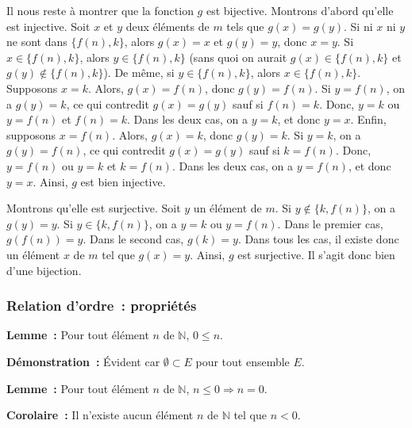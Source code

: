     Il nous reste à montrer que la fonction $g$ est bijective. 
    Montrons d'abord qu'elle est injective. 
    Soit $x$ et $y$ deux éléments de $m$ tels que $g(x) = g(y)$.
    Si ni $x$ ni $y$ ne sont dans $\lbrace f(n), k \rbrace$, alors $g(x) = x$ et $g(y) = y$, donc $x=y$. 
    Si $x \in \lbrace f(n), k \rbrace$, alors $y \in \lbrace f(n), k \rbrace$ (sans quoi on aurait $g(x) \in \lbrace f(n), k \rbrace$ et $g(y) \notin \lbrace f(n), k \rbrace$). 
    De même, si $y \in \lbrace f(n), k \rbrace$, alors $x \in \lbrace f(n), k \rbrace$. 
    Supposons $x = k$. 
    Alors, $g(x) = f(n)$, donc $g(y) = f(n)$. 
    Si $y = f(n)$, on a $g(y) = k$, ce qui contredit $g(x) = g(y)$ sauf si $f(n) = k$. 
    Donc, $y = k$ ou $y = f(n)$ et $f(n) = k$. 
    Dans les deux cas, on a $y = k$, et donc $y = x$. 
    Enfin, supposons $x = f(n)$. 
    Alors, $g(x) = k$, donc $g(y) = k$. 
    Si $y = k$, on a $g(y) = f(n)$, ce qui contredit $g(x) = g(y)$ sauf si $k = f(n)$. 
    Donc, $y = f(n)$ ou $y = k$ et $k = f(n)$. 
    Dans les deux cas, on a $y = f(n)$, et donc $y = x$. 
    Ainsi, $g$ est bien injective. 

    Montrons qu'elle est surjective. 
    Soit $y$ un élément de $m$. 
    Si $y \notin \lbrace k, f(n) \rbrace$, on a $g(y) = y$. 
    Si $y \in \lbrace k, f(n) \rbrace$, on a $y = k$ ou $y = f(n)$. 
    Dans le premier cas, $g(f(n)) = y$. 
    Dans le second cas, $g(k) = y$. 
    Dans tous les cas, il existe donc un élément $x$ de $m$ tel que $g(x) = y$. 
    Ainsi, $g$ est surjective. 
    Il s'agit donc bien d'une bijection. 

   \done 

\subsubsection{Relation d'ordre : propriétés}
\label{subsub:relOrdreProps}

\noindent\textbf{Lemme :} Pour tout élément $n$ de $\mathbb{N}$, $0 \leq n$.

\medskip

\noindent\textbf{Démonstration :} Évident car $\emptyset \subset E$ pour tout ensemble $E$. 

   \done 

\noindent\textbf{Lemme :} Pour tout élément $n$ de $\mathbb{N}$, $n \leq 0 \Rightarrow n = 0$.

\medskip

\noindent\textbf{Corolaire :} Il n'existe aucun élément $n$ de $\mathbb{N}$ tel que $n < 0$.

